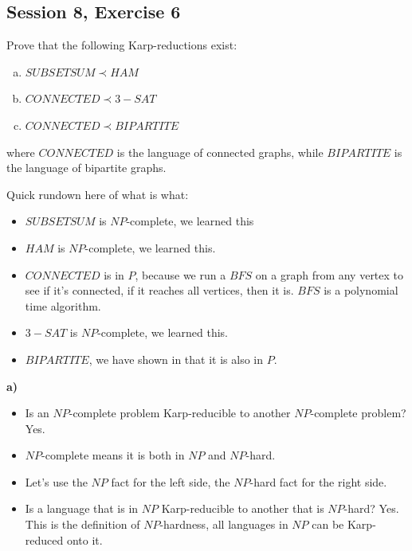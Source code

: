 \subsection {Session 8, Exercise 6}
\label{8_6}


Prove that the following Karp-reductions exist:

\begin{enumerate}[a)]
    \item $SUBSETSUM \prec HAM$
    \item $CONNECTED \prec 3-SAT$
    \item $CONNECTED \prec BIPARTITE$
\end{enumerate}

where $CONNECTED$ is the language of connected graphs, while $BIPARTITE$ is the language of bipartite graphs.


Quick rundown here of what is what:

\begin{itemize}
    \item $SUBSETSUM$ is $NP$-complete, we learned this
    \item $HAM$ is $NP$-complete, we learned this.
    \item $CONNECTED$ is in $P$, because we run a $BFS$ on a graph from any vertex to see if it's connected, if it reaches all vertices, then it is. $BFS$ is a polynomial time algorithm.
    \item $3-SAT$ is $NP$-complete, we learned this.
    \item $BIPARTITE$, we have shown in  that it is also in $P$.
\end{itemize}

\textbf{a)}

\begin{itemize}
    \item Is an $NP$-complete problem Karp-reducible to another $NP$-complete problem? Yes.
    \item $NP$-complete means it is both in $NP$ and $NP$-hard.
    \item Let's use the $NP$ fact for the left side, the $NP$-hard fact for the right side.
    \item Is a language that is in $NP$ Karp-reducible to another that is $NP$-hard? Yes. This is the definition of $NP$-hardness, all languages in $NP$ can be Karp-reduced onto it.
\end{itemize}

